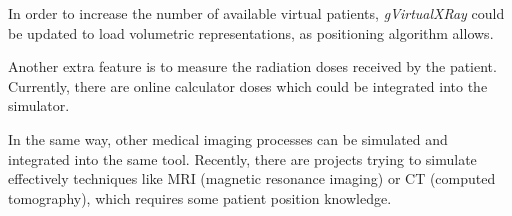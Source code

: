 
In order to increase the number of available virtual patients,  \emph{gVirtualXRay} could be updated to load volumetric representations, as positioning algorithm allows. 


Another extra feature is to measure the radiation doses received by the patient. Currently, there are online calculator doses  \cite{xraydose} which could be integrated into the simulator.

In the same way, other medical imaging processes can be simulated and integrated into the same tool. Recently, there are projects trying to simulate effectively techniques like MRI (magnetic resonance imaging) or CT (computed tomography), which requires some patient position knowledge. 

